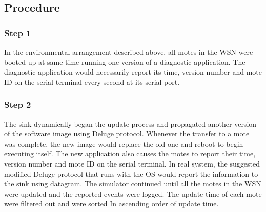 \documentclass[conference,final]{IEEEtran}
\begin{document}
\subsection*{Procedure}
\label{subsec:proc}
%
%
%
\subsubsection*{Step 1} 
In the environmental arrangement described above, all motes in the WSN were booted up at same time running one version of a diagnostic application. 
The diagnostic application would necessarily report its time, version number and mote ID on the serial terminal every second at its serial port. 


\subsubsection*{Step 2} 
The sink dynamically began the update process and propagated another version of the software image using Deluge protocol. %
Whenever the transfer to a mote was complete, the new image would replace the old one and reboot to begin executing itself.
The  new application also causes the motes to report their time, version number and mote ID on the serial terminal. 
In real system, the suggested modified Deluge protocol that runs with the OS would report the information to the sink using datagram.
The simulator continued until all the motes in the WSN were updated and the reported events were logged. 
The update time of each mote were filtered out  and were sorted In ascending order of update time.

\end{document}
